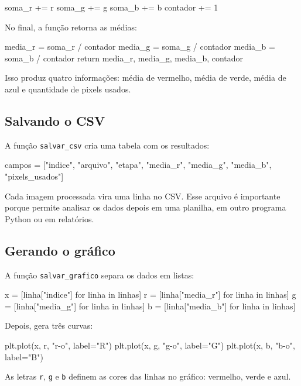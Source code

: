 \documentclass[12pt]{article}
\begin{document}
\begin{codebox}
soma_r += r
soma_g += g
soma_b += b
contador += 1
\end{codebox}

No final, a função retorna as médias:

\begin{codebox}
media_r = soma_r / contador
media_g = soma_g / contador
media_b = soma_b / contador
return media_r, media_g, media_b, contador
\end{codebox}

Isso produz quatro informações: média de vermelho, média de verde, média de azul e quantidade de pixels usados.

\subsection{Salvando o CSV}

A função \texttt{salvar\_csv} cria uma tabela com os resultados:

\begin{codebox}
campos = ["indice", "arquivo", "etapa",
          "media_r", "media_g", "media_b", "pixels_usados"]
\end{codebox}

Cada imagem processada vira uma linha no CSV. Esse arquivo é importante porque permite analisar os dados depois em uma planilha, em outro programa Python ou em relatórios.

\subsection{Gerando o gráfico}

A função \texttt{salvar\_grafico} separa os dados em listas:

\begin{codebox}
x = [linha["indice"] for linha in linhas]
r = [linha["media_r"] for linha in linhas]
g = [linha["media_g"] for linha in linhas]
b = [linha["media_b"] for linha in linhas]
\end{codebox}

Depois, gera três curvas:

\begin{codebox}
plt.plot(x, r, "r-o", label="R")
plt.plot(x, g, "g-o", label="G")
plt.plot(x, b, "b-o", label="B")
\end{codebox}

As letras \texttt{r}, \texttt{g} e \texttt{b} definem as cores das linhas no gráfico: vermelho, verde e azul.
\end{document}
